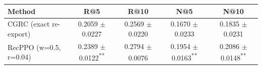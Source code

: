 \begin{tabular}{lcccc}
\toprule
Method & R@5 & R@10 & N@5 & N@10 \\
\midrule
CGRC (exact re-export) & 0.2059 $\pm$ 0.0227 & 0.2569 $\pm$ 0.0220 & 0.1670 $\pm$ 0.0233 & 0.1835 $\pm$ 0.0231 \\
RecPPO (w=0.5, r=0.04) & 0.2389 $\pm$ 0.0122\textsuperscript{\scriptsize ***} & 0.2794 $\pm$ 0.0076\textsuperscript{\scriptsize *} & 0.1954 $\pm$ 0.0163\textsuperscript{\scriptsize ***} & 0.2086 $\pm$ 0.0148\textsuperscript{\scriptsize ***} \\
\bottomrule
\end{tabular}

